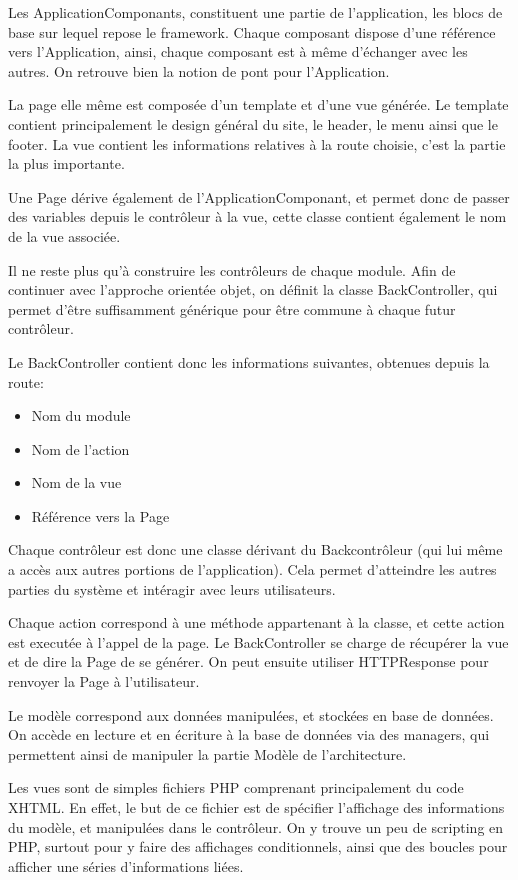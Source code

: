 Les ApplicationComponants, constituent une partie de l'application, les blocs de base sur lequel repose le framework.
Chaque composant dispose d'une référence vers l'Application, ainsi, chaque composant est à même d'échanger avec les autres.
On retrouve bien la notion de pont pour l'Application.

La page elle même est composée d'un template et d'une vue générée.
Le template contient principalement le design général du site, le header, le menu ainsi que le footer.
La vue contient les informations relatives à la route choisie, c'est la partie la plus importante.

Une Page dérive également de l'ApplicationComponant, et permet donc de passer des variables depuis le contrôleur à la vue,
cette classe contient également le nom de la vue associée.

Il ne reste plus qu'à construire les contrôleurs de chaque module.
Afin de continuer avec l'approche orientée objet, on définit la classe BackController, qui permet d'être
suffisamment générique pour être commune à chaque futur contrôleur.

Le BackController contient donc les informations suivantes, obtenues depuis la route:

    \begin{itemize}
    \item Nom du module
    \item Nom de l'action
    \item Nom de la vue
    \item Référence vers la Page
    \end{itemize}

Chaque contrôleur est donc une classe dérivant du Backcontrôleur (qui lui même a accès aux autres portions de l'application).
Cela permet d'atteindre les autres parties du système et intéragir avec leurs utilisateurs.

Chaque action correspond à une méthode appartenant à la classe, et cette action est executée à l'appel de la page.
Le BackController se charge de récupérer la vue et de dire la Page de se générer. On peut ensuite utiliser HTTPResponse pour
renvoyer la Page à l'utilisateur.

Le modèle correspond aux données manipulées, et stockées en base de données. On accède en lecture et en écriture à la base de données
via des managers, qui permettent ainsi de manipuler la partie Modèle de l'architecture.

Les vues sont de simples fichiers PHP comprenant principalement du code XHTML. En effet, le but de ce fichier est de spécifier
l'affichage des informations du modèle, et manipulées dans le contrôleur. On y trouve un peu de scripting en PHP, surtout
pour y faire des affichages conditionnels, ainsi que des boucles pour afficher une séries d'informations liées.

